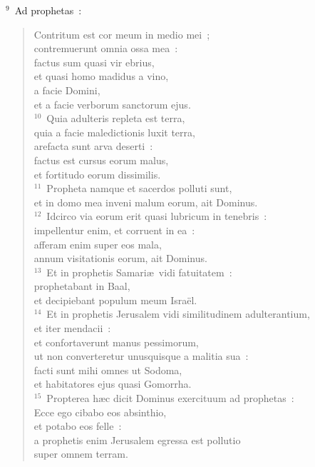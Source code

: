 ${}^{9}$~Ad prophetas~: \begin{flushleft}\begin{verse}Contritum est cor meum in medio mei~;\\ contremuerunt omnia ossa mea~:\\ factus sum quasi vir ebrius,\\ et quasi homo madidus a vino,\\ a facie Domini,\\ et a facie verborum sanctorum ejus.\\
${}^{10}$~Quia adulteris repleta est terra,\\ quia a facie maledictionis luxit terra,\\ arefacta sunt arva deserti~:\\ factus est cursus eorum malus,\\ et fortitudo eorum dissimilis.\\
${}^{11}$~Propheta namque et sacerdos polluti sunt,\\ et in domo mea inveni malum eorum, ait Dominus.\\
${}^{12}$~Idcirco via eorum erit quasi lubricum in tenebris~:\\ impellentur enim, et corruent in ea~:\\ afferam enim super eos mala,\\ annum visitationis eorum, ait Dominus.\\
${}^{13}$~Et in prophetis Samari\ae\ vidi fatuitatem~:\\ prophetabant in Baal,\\ et decipiebant populum meum Isra\"el.\\
${}^{14}$~Et in prophetis Jerusalem vidi similitudinem adulterantium,\\ et iter mendacii~:\\ et confortaverunt manus pessimorum,\\ ut non converteretur unusquisque a malitia sua~:\\ facti sunt mihi omnes ut Sodoma,\\ et habitatores ejus quasi Gomorrha.\\
${}^{15}$~Propterea h\ae c dicit Dominus exercituum ad prophetas~:\\ Ecce ego cibabo eos absinthio,\\ et potabo eos felle~:\\ a prophetis enim Jerusalem egressa est pollutio\\ super omnem terram.\\

\end{verse}
\end{flushleft}
